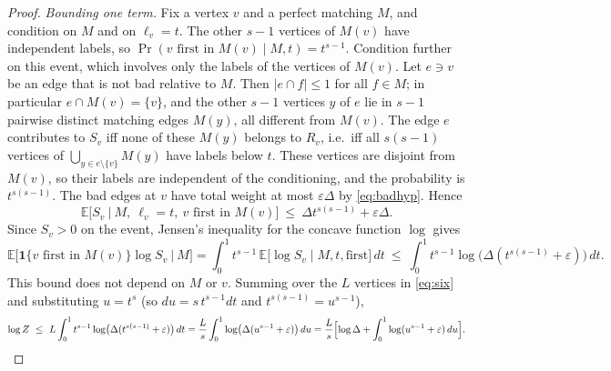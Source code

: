 \documentclass[11pt,a4paper]{article}
\theoremstyle{plain}
\theoremstyle{definition}
\theoremstyle{remark}
\newcommand{\E}{\mathbb E}
\newcommand{\ind}{\mathbf 1}
\begin{document}
\begin{proof}
\emph{Bounding one term.} Fix a vertex $v$ and a perfect matching $M$, and condition on $M$ and on $\ell_v=t$. The other $s-1$ vertices of $M(v)$ have independent labels, so $\Pr(v\text{ first in }M(v)\mid M,t)=t^{s-1}$. Condition further on this event, which involves only the labels of the vertices of $M(v)$. Let $e\ni v$ be an edge that is not bad relative to $M$. Then $|e\cap f|\le1$ for all $f\in M$; in particular $e\cap M(v)=\{v\}$, and the other $s-1$ vertices $y$ of $e$ lie in $s-1$ pairwise distinct matching edges $M(y)$, all different from $M(v)$. The edge $e$ contributes to $S_v$ iff none of these $M(y)$ belongs to $R_v$, i.e.\ iff all $s(s-1)$ vertices of $\bigcup_{y\in e\setminus\{v\}}M(y)$ have labels below $t$. These vertices are disjoint from $M(v)$, so their labels are independent of the conditioning, and the probability is $t^{s(s-1)}$. The bad edges at $v$ have total weight at most $\varepsilon\Delta$ by \eqref{eq:badhyp}. Hence
\[
\E\bigl[S_v\ \big|\ M,\ \ell_v=t,\ v\text{ first in }M(v)\bigr]\ \le\ \Delta t^{s(s-1)}+\varepsilon\Delta .
\]
Since $S_v>0$ on the event, Jensen's inequality for the concave function $\log$ gives
\[
\E\bigl[\ind\{v\text{ first in }M(v)\}\log S_v\ \big|\ M\bigr]
=\int_0^1 t^{s-1}\,\E\bigl[\log S_v\mid M,t,\text{first}\bigr]\,dt
\ \le\ \int_0^1 t^{s-1}\log\bigl(\Delta(t^{s(s-1)}+\varepsilon)\bigr)\,dt .
\]
This bound does not depend on $M$ or $v$. Summing over the $L$ vertices in \eqref{eq:six} and substituting $u=t^s$ (so $du=s\,t^{s-1}dt$ and $t^{s(s-1)}=u^{s-1}$),
\[
\log Z\ \le\ L\int_0^1 t^{s-1}\log\bigl(\Delta(t^{s(s-1)}+\varepsilon)\bigr)\,dt
=\frac Ls\int_0^1\log\bigl(\Delta(u^{s-1}+\varepsilon)\bigr)\,du
=\frac Ls\Bigl[\log\Delta+\int_0^1\log(u^{s-1}+\varepsilon)\,du\Bigr]. \qedhere
\]
\end{proof}
\end{document}

